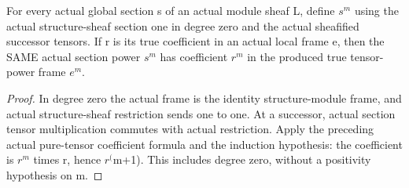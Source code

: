 \begin{definition}
\label{def:seven-native-actual-section-tensor-powers}
\leanok
For every actual global section s of an actual module sheaf L, define $s^m$
using the actual structure-sheaf section one in degree zero and the actual
sheafified successor tensors. If r is its true coefficient in an actual
local frame e, then the SAME actual section power $s^m$ has coefficient $r^m$
in the produced true tensor-power frame $e^m$.
\end{definition}
\begin{proof}
In degree zero the actual frame is the identity structure-module frame,
and actual structure-sheaf restriction sends one to one. At a successor,
actual section tensor multiplication commutes with actual restriction.
Apply the preceding actual pure-tensor coefficient formula and the
induction hypothesis: the coefficient is $r^m$ times r, hence $r^($m+1).
This includes degree zero, without a positivity hypothesis on m.
\end{proof}

